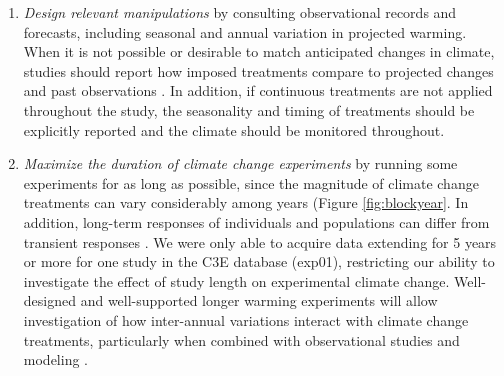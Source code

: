 \documentclass{article}
\begin{document}
\begin{enumerate}
\item\textit{Design relevant manipulations} by consulting observational records and forecasts, including seasonal and annual variation in projected warming. When it is not possible or desirable to match anticipated changes in climate, studies should report how imposed treatments compare to projected changes and past observations \citep[e.g.,][]{hoover2014}. In addition, if continuous treatments are not applied throughout the study, the seasonality and timing of treatments should be explicitly reported and the climate should be monitored throughout.

\item\textit{Maximize the duration of climate change experiments} by running some experiments for as long as possible, since the magnitude of climate change treatments can vary considerably among years (Figure \ref{fig:blockyear}. In addition, long-term responses of individuals and populations can differ from transient responses \citep{saleska2002,franklin1989,giasson2013,harte2015}. We were only able to acquire data extending for 5 years or more for one study in the C3E database (exp01), restricting our ability to investigate the effect of study length on experimental climate change. Well-designed and well-supported longer warming experiments will allow investigation of how inter-annual variations interact with climate change treatments, particularly when combined with observational studies and modeling \citep{luo2011}.

\end{enumerate}

\clearpage
\end{document}
